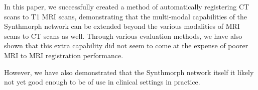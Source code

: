 In this paper, we successfully created a method of automatically registering CT scans to T1 MRI scans, demonstrating that the multi-modal capabilities of the Synthmorph network can be extended beyond the various modalities of MRI scans to CT scans as well. Through various evaluation methods, we have also shown that this extra capability did not seem to come at the expense of poorer MRI to MRI registration performance.

However, we have also demonstrated that the Synthmorph network itself it likely not yet good enough to be of use in clinical settings in practice.
